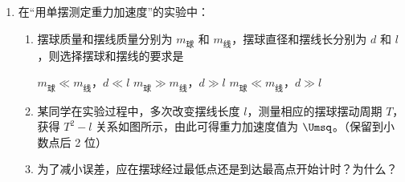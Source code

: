 \documentclass[\gkver]{gaokaozhenti}
\begin{document}
\begin{enumerate}
{由电路结构可知，通过 ad 的电流为通过 ab、bc、cd 支路的 3 倍，又因为电流产生的磁感应强度的大小在距离相同的情况下与电流大小成正比，因此三者产生的磁感应强度的大小为 ad 产生的磁感应强度的 $\frac{1}{3}$。由磁场叠加原理可知四个磁场的矢量和为 0。

\onepicture[w=4.5cm]{}
}

\item
在“用单摆测定重力加速度”的实验中：
\begin{enumerate}
	\item
	摆球质量和摆线质量分别为 $m_{\text{球}}$ 和 $m_{\text{线}}$，摆球直径和摆线长分别为 $d$ 和 $l$，则选择摆球和摆线的要求是

	{$m_{\text{球}} \ll m_{\text{线}}$，$d \ll l$}
	{$m_{\text{球}} \gg m_{\text{线}}$，$d \gg l$}
	{$m_{\text{球}} \ll m_{\text{线}}$，$d \gg l$}

	\item
	某同学在实验过程中，多次改变摆线长度 $l$，测量相应的摆球摆动周期 $T$，获得 $T^{2}-l$ 关系如图所示，由此可得重力加速度值为 $\Umsq$。（保留到小数点后 2 位）

	\item
	为了减小误差，应在摆球经过最低点还是到达最高点开始计时？为什么？
\end{enumerate}
\onepicture[w=5cm, align=right]{}
\end{enumerate}
\end{document}
